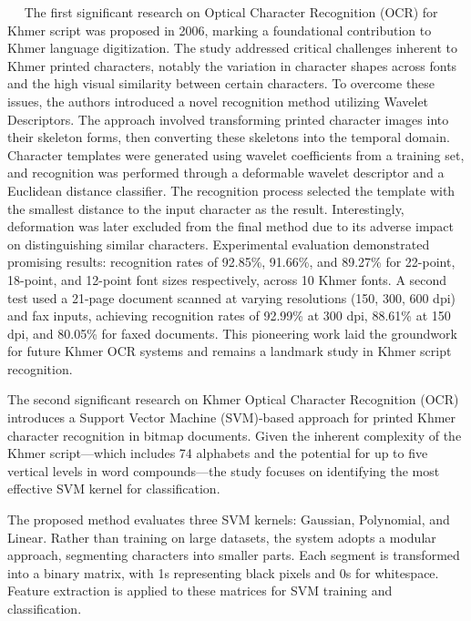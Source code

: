​ ​ ​ ​ \citet{CheyFirstOCR} The first significant research on Optical Character Recognition (OCR) 
for Khmer script was proposed in 2006, marking a foundational contribution 
to Khmer language digitization. The study addressed critical challenges 
inherent to Khmer printed characters, notably the variation in character 
shapes across fonts and the high visual similarity between certain 
characters. To overcome these issues, the authors introduced a novel 
recognition method utilizing Wavelet Descriptors. The approach involved 
transforming printed character images into their skeleton forms, 
then converting these skeletons into the temporal domain. Character 
templates were generated using wavelet coefficients from a training set, 
and recognition was performed through a deformable wavelet descriptor 
and a Euclidean distance classifier. The recognition process selected 
the template with the smallest distance to the input character as the 
result. Interestingly, deformation was later excluded from the final 
method due to its adverse impact on distinguishing similar characters. 
Experimental evaluation demonstrated promising results: recognition 
rates of 92.85\%, 91.66\%, and 89.27\% for 22-point, 18-point, and 
12-point font sizes respectively, across 10 Khmer fonts. A second 
test used a 21-page document scanned at varying resolutions 
(150, 300, 600 dpi) and fax inputs, achieving recognition rates 
of 92.99\% at 300 dpi, 88.61\% at 150 dpi, and 80.05\% for faxed documents. 
This pioneering work laid the groundwork for future Khmer OCR systems 
and remains a landmark study in Khmer script recognition.

\citet{Sok&Taing2014} The second significant research on 
Khmer Optical Character Recognition (OCR) introduces a Support 
Vector Machine (SVM)-based approach for printed Khmer character 
recognition in bitmap documents. Given the inherent complexity 
of the Khmer script—which includes 74 alphabets and the potential 
for up to five vertical levels in word compounds—the study focuses 
on identifying the most effective SVM kernel for classification.

The proposed method evaluates three SVM kernels: Gaussian, Polynomial, 
and Linear. Rather than training on large datasets, the system adopts 
a modular approach, segmenting characters into smaller parts. Each 
segment is transformed into a binary matrix, with 1s representing 
black pixels and 0s for whitespace. Feature extraction is applied 
to these matrices for SVM training and classification.

